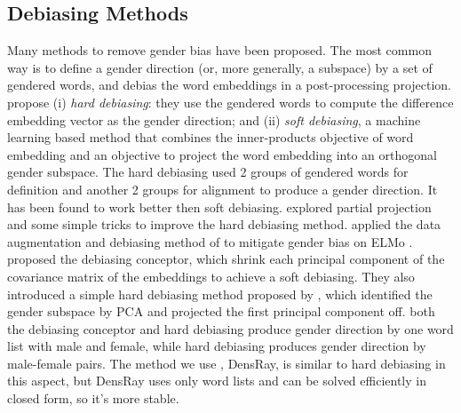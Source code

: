 \subsection{Debiasing Methods}
 Many methods to remove gender bias have been proposed. The
 most common way is to define a gender direction (or, more
 generally, a subspace) by a set of gendered words, and
 debias the word embeddings in a post-processing
 projection. \cite{bolukbasi2016man} propose (i) \emph{hard
   debiasing}: they use the gendered words to compute the
 difference embedding vector as the gender direction; and
 (ii) \emph{soft debiasing},
 a
 machine learning based method
that combines
 the inner-products objective of word embedding and an
 objective to project the word embedding into an orthogonal
 gender subspace. The \cite{bolukbasi2016man} hard debiasing used 2 groups of gendered words for definition and another 2 groups for alignment to produce a gender direction. It has been found to work
 better then soft debiasing.  \cite{dev2019attenuating} explored partial projection and
 some simple tricks to improve the hard debiasing
 method. \cite{zhao2019gender} applied the data
 augmentation and debiasing method of
 \cite{bolukbasi2016man} to mitigate gender bias on ELMo
 \cite{Peters:2018}. \cite{karve2019conceptor} proposed
 the debiasing conceptor, which shrink each
 principal component of the covariance matrix of the
 embeddings to achieve a soft debiasing. They also introduced a simple hard debiasing method proposed by \cite{mu2018all}, which identified the gender subspace by PCA and projected the first principal component off.
both the debiasing conceptor and hard debiasing \cite{mu2018all} produce gender direction by one word list with male and female, while hard debiasing \cite{bolukbasi2016man} produces gender direction by male-female pairs.
 The method we use
, DensRay, is similar to
hard debiasing \cite{bolukbasi2016man} in this aspect, but DensRay uses only word lists and can be solved efficiently in closed form, so it's more stable.

 



